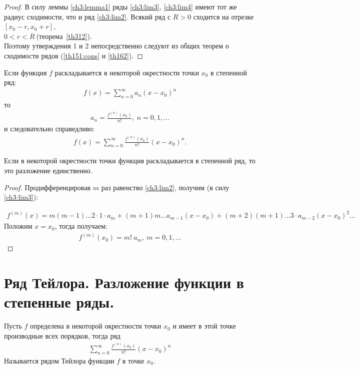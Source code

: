 \begin{proof}
  В силу леммы \eqref{ch3:lemma1} ряды \eqref{ch3:lim3}, \eqref{ch3:lim4} имеют
  тот же радиус сходимости, что и ряд \eqref{ch3:lim2}. Всякий ряд с $R >
  0$ сходится на отрезке $[x_0 - r, x_0 + r]$, \\
  $0 < r < R \ $(теорема~\eqref{th312}). \\
  Поэтому утверждения 1 и 2 непосредственно следуют из общих теорем о
  сходимости рядов (\eqref{th151:cons} и \eqref{th162}).
\end{proof}

\begin{theorem}
  Если функция $f$ раскладывается в некоторой окрестности точки $x_0$
  в степенной ряд:
  \begin{gather*}
    f(x) = \sum\limits_{n = 0}^{\infty} a_n (x - x_0)^n
  \end{gather*}
  то
  \begin{gather}
    a_n = \frac{f^{(n)}(x_0)}{n!}, \ n = 0, 1, \dots
    \label{ch3:lim5}
  \end{gather}
  и следовательно справедливо:
  \begin{gather}
    f(x) = \sum\limits_{n = 0}^{\infty} \frac{f^{(n)}(x_0)}{n!} (x - x_0)^n
    \label{ch3:lim6}.
  \end{gather}
\end{theorem}

\begin{consequence}
  \label{th322:cons}
  Если в некоторой окрестности точки функция раскладывается в степенной ряд, то
  это разложение единственно.
\end{consequence}

\begin{proof}
  Продифференцировав $m$ раз равенство \eqref{ch3:lim2}, получим (в силу \eqref{ch3:lim3}):

  \begin{gather*}
    f^{(m)}(x) = m(m-1)\dots 2 \cdot 1 \cdot a_m +
    (m+1)m \dots a_{m-1} (x-x_0) + (m+2)(m+1) \dots 3 \cdot a_{m-2} (x -
    x_0)^2\dots
  \end{gather*}
  Положим $x = x_0$, тогда получаем:
  \begin{gather*}
    f^{(m)}(x_0) = m! \ a_m, \ m = 0, 1, \dots
  \end{gather*}
\end{proof}

\section{Ряд Тейлора. Разложение функции в степенные ряды.}
\begin{definition}
  Пусть $f$ определена в некоторой окрестности точки $x_0$ и имеет в этой точке
  производные всех порядков, тогда ряд
  \begin{gather}
    \sum\limits_{n = 0}^{\infty} \frac{f^{(n)}(x_0)}{n!} (x-x_0)^n
    \label{def331:series1}
  \end{gather}
  Называется рядом Тейлора функции $f$ в точке $x_0$.
\end{definition}


